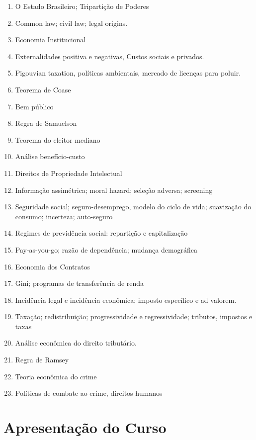 \documentclass[a4paper,12pt]{article}[abntex2]
\begin{document}
\begin{enumerate}
    \item O Estado Brasileiro; Tripartição de Poderes
    \item Common law; civil law; legal origins.
    \item Economia Institucional
    \item Externalidades positiva e negativas, Custos sociais e privados.
    \item Pigouvian taxation, políticas ambientais, mercado de licenças para poluir.
    \item Teorema de Coase
    \item Bem público
    \item Regra de Samuelson
    \item Teorema do eleitor mediano
    \item Análise benefício-custo
    \item Direitos de Propriedade Intelectual
    \item Informação assimétrica; moral hazard; seleção adversa; screening
    \item Seguridade social; seguro-desemprego, modelo do ciclo de vida; suavização do consumo; incerteza; auto-seguro
    \item Regimes de previdência social: repartição e capitalização
    \item Pay-as-you-go; razão de dependência; mudança demográfica
    \item Economia dos Contratos
    \item Gini; programas de transferência de renda
    \item Incidência legal e incidência econômica; imposto específico e ad valorem.
    \item Taxação; redistribuição; progressividade e regressividade; tributos, impostos e taxas
    \item Análise econômica do direito tributário.
    \item Regra de Ramsey
    \item Teoria econômica do crime
    \item Políticas de combate ao crime, direitos humanos
\end{enumerate}
\newpage

\section{\textbf{Apresentação do Curso}}
\end{document}

